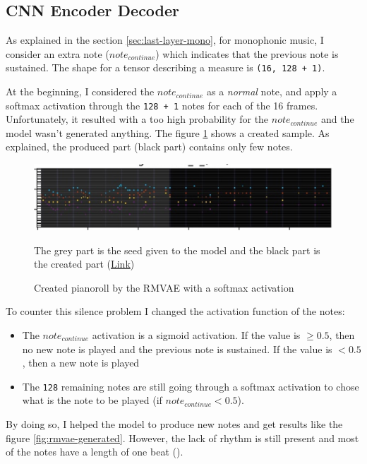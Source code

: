 \documentclass[12pt]{report}
\begin{document}
\subsection{CNN Encoder Decoder}

As explained in the section \ref{sec:last-layer-mono}, for monophonic music, I consider an extra note ($note_{continue}$) which indicates that the previous note is sustained.
The shape for a tensor describing a measure is \texttt{(16, 128 + 1)}.

At the beginning, I considered the $note_{continue}$ as a \textit{normal} note, and apply a softmax activation through the \texttt{128 + 1} notes for each of the 16 frames.
Unfortunately, it resulted with a too high probability for the $note_{continue}$ and the model wasn't generated anything.
The figure \ref{fig:rmvae-generated-silence} shows a created sample.
As explained, the produced part (black part) contains only few notes.

\begin{figure}[htbp]
    \centering
    \includegraphics[width=\textwidth]{images/generated_midis/RMVAE/cnn_generation_silence.jpg}
    \caption{Created pianoroll by the RMVAE with a softmax activation}
    The grey part is the seed given to the model and the black part is the created part
    (\href{https://github.com/ValentinVignal/midiGenerator/blob/master/samples/results/generated_silence.mid}{Link})
    \label{fig:rmvae-generated-silence}
\end{figure}

To counter this silence problem I changed the activation function of the notes:
\begin{itemize}
    \item The $note_{continue}$ activation is a sigmoid activation.
    If the value is $\geq 0.5$, then no new note is played and the previous note is sustained.
    If the value is $< 0.5$, then a new note is played
    \item The \texttt{128} remaining notes are still going through a softmax activation to chose what is the note to be played (if $note_{continue} <0.5$).
\end{itemize}

By doing so, I helped the model to produce new notes and get results like the figure \ref{fig:rmvae-generated}.
However, the lack of rhythm is still present and most of the notes have a length of one beat (\musQuarter).
\end{document}

